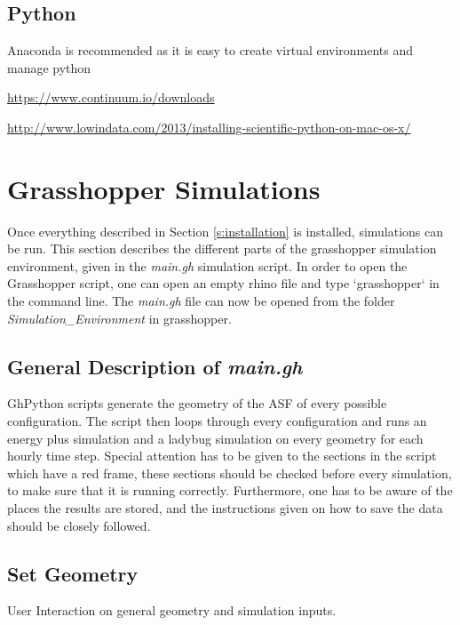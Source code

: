 	\subsection{Python}
	Anaconda is recommended as it is easy to create virtual environments and manage python

	\url{https://www.continuum.io/downloads}\\


	\url{http://www.lowindata.com/2013/installing-scientific-python-on-mac-os-x/}\\



\section{Grasshopper Simulations}

	
	Once everything described in Section \ref{s:installation} is installed, simulations can be run. This section describes the different parts of the grasshopper simulation environment, given in the \emph{main.gh} simulation script. In order to open the Grasshopper script, one can open an empty rhino file and type `grasshopper` in the command line. The \emph{main.gh} file can now be opened from the folder \emph{Simulation\_Environment} in grasshopper.



	\subsection{General Description of \emph{main.gh}}
		GhPython scripts generate the geometry of the ASF of every possible configuration. The script then loops through every configuration and runs an energy plus simulation and a ladybug simulation on every geometry for each hourly time step. Special attention has to be given to the sections in the script which have a red frame, these sections should be checked before every simulation, to make sure that it is running correctly. Furthermore, one has to be aware of the places the results are stored, and the instructions given on how to save the data should be closely followed. 



	\subsection{Set Geometry}
	User Interaction on general geometry and simulation inputs.

